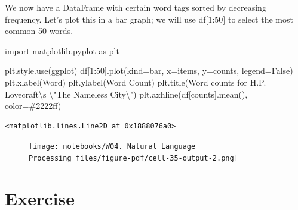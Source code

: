 \documentclass[
  letterpaper,
  DIV=11,
  numbers=noendperiod]{scrreprt}
\newenvironment{Shaded}{\begin{snugshade}}{\end{snugshade}}
\newcommand{\CharTok}[1]{\textcolor[rgb]{0.13,0.47,0.30}{#1}}
\newcommand{\DecValTok}[1]{\textcolor[rgb]{0.68,0.00,0.00}{#1}}
\newcommand{\ImportTok}[1]{\textcolor[rgb]{0.00,0.46,0.62}{#1}}
\newcommand{\NormalTok}[1]{\textcolor[rgb]{0.00,0.23,0.31}{#1}}
\newcommand{\OperatorTok}[1]{\textcolor[rgb]{0.37,0.37,0.37}{#1}}
\newcommand{\StringTok}[1]{\textcolor[rgb]{0.13,0.47,0.30}{#1}}
\newcommand{\VariableTok}[1]{\textcolor[rgb]{0.07,0.07,0.07}{#1}}
\begin{document}
We now have a DataFrame with certain word tags sorted by decreasing
frequency. Let's plot this in a bar graph; we will use df{[}1:50{]} to
select the most common 50 words.

\begin{Shaded}
\begin{Highlighting}[]
\ImportTok{import}\NormalTok{ matplotlib.pyplot }\ImportTok{as}\NormalTok{ plt}
\end{Highlighting}
\end{Shaded}

\begin{Shaded}
\begin{Highlighting}[]
\NormalTok{plt.style.use(}\StringTok{\textquotesingle{}ggplot\textquotesingle{}}\NormalTok{)}
\NormalTok{df[}\DecValTok{1}\NormalTok{:}\DecValTok{50}\NormalTok{].plot(kind}\OperatorTok{=}\StringTok{\textquotesingle{}bar\textquotesingle{}}\NormalTok{, x}\OperatorTok{=}\StringTok{\textquotesingle{}items\textquotesingle{}}\NormalTok{, y}\OperatorTok{=}\StringTok{\textquotesingle{}counts\textquotesingle{}}\NormalTok{, legend}\OperatorTok{=}\VariableTok{False}\NormalTok{)}
\NormalTok{plt.xlabel(}\StringTok{\textquotesingle{}Word\textquotesingle{}}\NormalTok{)}
\NormalTok{plt.ylabel(}\StringTok{\textquotesingle{}Word Count\textquotesingle{}}\NormalTok{)}
\NormalTok{plt.title(}\StringTok{\textquotesingle{}Word counts for H.P. Lovecraft}\CharTok{\textbackslash{}\textquotesingle{}}\StringTok{s }\CharTok{\textbackslash{}"}\StringTok{The Nameless City}\CharTok{\textbackslash{}"}\StringTok{\textquotesingle{}}\NormalTok{)}
\NormalTok{plt.axhline(df[}\StringTok{\textquotesingle{}counts\textquotesingle{}}\NormalTok{].mean(), color}\OperatorTok{=}\StringTok{\textquotesingle{}\#2222ff\textquotesingle{}}\NormalTok{)}
\end{Highlighting}
\end{Shaded}

\begin{verbatim}
<matplotlib.lines.Line2D at 0x1888076a0>
\end{verbatim}

\begin{figure}[H]

{\centering \texttt{[image: notebooks/W04. Natural Language Processing\_files/figure-pdf/cell-35-output-2.png]}

}

\end{figure}

\hypertarget{exercise-10}{%
\section{Exercise}\label{exercise-10}}
\end{document}
